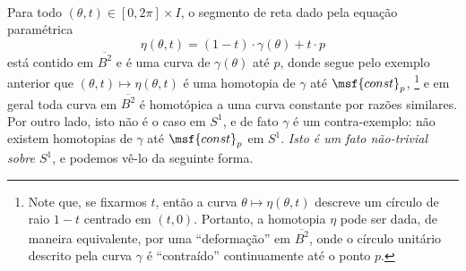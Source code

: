 \begin{figure}[htpb]
\centering
\captionsetup{singlelinecheck=off,justification=centering}
~~~
\end{figure}

Para todo $(\theta, t) \in [0, 2\pi] \times I$, o segmento de reta dado pela equação paramétrica
\begin{equation}
    \eta(\theta, t) = (1 - t) \cdot \gamma(\theta) + t \cdot p
\label{eq:linear_homotopy_2}
\end{equation}
está contido em $\overline{B^2}$ e é uma curva de $\gamma(\theta)$ até $p$, donde segue pelo exemplo anterior que $(\theta, t) \mapsto \eta(\theta, t)$ é uma homotopia de $\gamma$ até $\msf{const}_p$,%
\footnote
{
    Note que, se fixarmos $t$, então a curva $\theta \mapsto \eta(\theta, t)$ descreve um círculo de raio $1 - t$ centrado em $(t, 0)$. Portanto, a homotopia $\eta$ pode ser dada, de maneira equivalente, por uma ``deformação'' em $\overline{B^2}$, onde o círculo unitário descrito pela curva $\gamma$ é ``contraído'' continuamente até o ponto $p$.
}
e em geral toda curva em $\overline{B^2}$ é homotópica a uma curva constante por razões similares. Por outro lado, isto não é o caso em $S^1$, e de fato $\gamma$ é um contra-exemplo: não existem homotopias de $\gamma$ até $\msf{const}_p$ em $S^1$. {\it Isto é um fato não-trivial sobre $S^1$}, e podemos vê-lo da seguinte forma.%
\linebreak\vspace{-1.2em}

